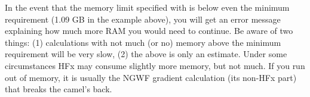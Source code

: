 \documentclass[letterpaper,10pt,english]{sphinxmanual}
\begin{document}
\begin{sphinxVerbatim}[commandchars=\\\{\}]
                 
\end{sphinxVerbatim}

In the event that the memory limit specified with 
is below even the minimum requirement (1.09 GB in the example above),
you will get an error message explaining how much more RAM you would
need to continue. Be aware of two things: (1) calculations with not much
(or no) memory above the minimum requirement will be very slow, (2) the
above is only an estimate. Under some circumstances HFx may consume
slightly more memory, but not much. If you run out of memory, it is
usually the NGWF gradient calculation (its non-HFx part) that breaks the
camel’s back.
\end{document}
